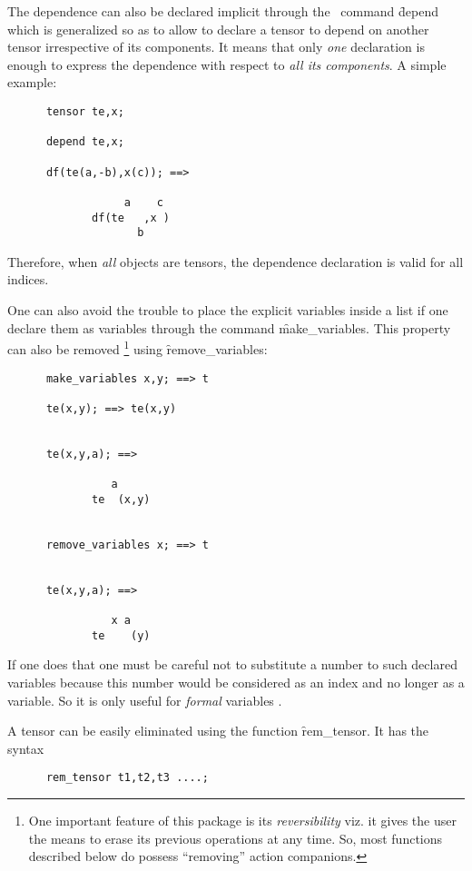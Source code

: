 The dependence can also be declared implicit through the \REDUCE\ command
\f{depend}
which is generalized so as to allow to declare a tensor
to depend on another tensor irrespective of its components. It means that only \emph{one}
declaration is enough to express the dependence with respect to
\emph{all its components}.
A simple example:
\begin{verbatim}
      tensor te,x;

      depend te,x;

      df(te(a,-b),x(c)); ==>

                  a    c
             df(te   ,x )
                    b
\end{verbatim}
Therefore, when \emph{all} objects are tensors, the dependence declaration
is valid for all indices.

One can also avoid the trouble to place the explicit variables inside a list if
one declare them as variables through the command
\hypertarget{command:MAKE_VARIABLES}{}
\hypertarget{command:REMOVE_VARIABLES}{}
\f{make\_variables}.
This property can also be removed%
\footnote{One important feature of this package is its \emph{reversibility}
viz. it gives the user the means to erase its previous operations
at any time. So, most functions described below do
possess ``removing'' action companions.} using
\f{remove\_variables}:
\begin{verbatim}
      make_variables x,y; ==> t

      te(x,y); ==> te(x,y)


      te(x,y,a); ==>

                a
             te  (x,y)


      remove_variables x; ==> t


      te(x,y,a); ==>

                x a
             te    (y)
\end{verbatim}
If one does that one must be careful not to substitute a number to such
declared variables because this number would be considered as an index and
no longer as a variable. So it is only useful for \emph{formal} variables%
.

\hypertarget{command:REM_TENSOR}{}
A tensor can be easily eliminated using the function
\f{rem\_tensor}. It has the syntax
\begin{verbatim}
      rem_tensor t1,t2,t3 ....;
\end{verbatim}

